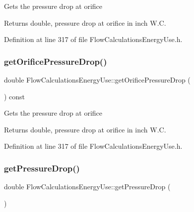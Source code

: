 Gets the pressure drop at orifice

\begin{DoxyReturn}{Returns}
double, pressure drop at orifice in inch W.\+C. 
\end{DoxyReturn}


Definition at line 317 of file Flow\+Calculations\+Energy\+Use.\+h.

\mbox{\label{class_flow_calculations_energy_use_ac42e5918bba0c56406f39437317a2a87}} 
\subsubsection{\texorpdfstring{get\+Orifice\+Pressure\+Drop()}{getOrificePressureDrop()}\hspace{0.1cm}{\footnotesize\ttfamily [3/3]}}
{\footnotesize\ttfamily double Flow\+Calculations\+Energy\+Use\+::get\+Orifice\+Pressure\+Drop (\begin{DoxyParamCaption}{ }\end{DoxyParamCaption}) const\hspace{0.3cm}{\ttfamily [inline]}}

Gets the pressure drop at orifice

\begin{DoxyReturn}{Returns}
double, pressure drop at orifice in inch W.\+C. 
\end{DoxyReturn}


Definition at line 317 of file Flow\+Calculations\+Energy\+Use.\+h.

\mbox{\label{class_flow_calculations_energy_use_a35aa80b2b9ea8769d56bf9e8d5837927}} 
\subsubsection{\texorpdfstring{get\+Pressure\+Drop()}{getPressureDrop()}\hspace{0.1cm}{\footnotesize\ttfamily [1/3]}}
{\footnotesize\ttfamily double Flow\+Calculations\+Energy\+Use\+::get\+Pressure\+Drop (\begin{DoxyParamCaption}{ }\end{DoxyParamCaption})}

